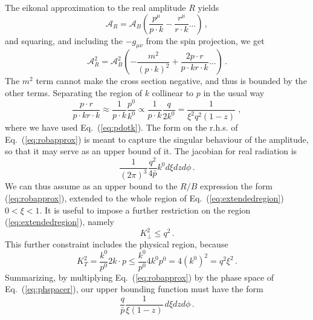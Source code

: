 \documentclass[11pt,a4paper]{article}
\begin{document}
The eikonal approximation to the real amplitude $R$ yields
\begin{equation}
  \mathcal{A}_R = \mathcal{A}_B \left( \frac{p^{\mu}}{p \cdot k} -
  \frac{r^{\mu}}{r \cdot k} \ldots \right) \, ,
\end{equation}
and squaring, and including the $- g_{\mu \nu}$ from the spin projection, we
get
\begin{equation}
  \mathcal{A}_R^2 = \mathcal{A}_B^2 \left( - \frac{m^2}{(p \cdot k)^2} +
  \frac{2 p \cdot r}{p \cdot kr \cdot k} \ldots \right) \, .
\end{equation}
The $m^2$ term cannot make the cross section negative, and thus is bounded
by the other terms. Separating the region of $k$ collinear to $p$ in the usual
way
\begin{equation}
  \frac{p \cdot r}{p \cdot kr \cdot k} \approx \frac{1}{p \cdot k} 
  \frac{p^0}{k^0} \propto \frac{1}{p \cdot k}  \frac{q}{2 k^0} =
  \frac{1}{\xi^2 q^2 \left( 1 - z \right)} \text{} \frac{}{} \text{} \, ,
  \label{eq:robapprox}
\end{equation}
where we have used Eq.~(\ref{eq:pdotk}). The form on the r.h.s. of
Eq.~(\ref{eq:robapprox}) is meant to capture the singular behaviour of the
amplitude, so that it may serve as an upper bound of it. The jacobian for real
radiation is
\begin{equation}
  \frac{1}{(2 \pi)^3} \frac{q^2}{4 \bar{p}} k^0 d \xi dzd \phi \, .
  \label{eq:phspacer}
\end{equation}
We can thus assume as an upper bound to the $R / B$ expression the form
(\ref{eq:robapprox}), extended to the whole region of Eq.~(\ref{eq:extendedregion}) 
$0 < \xi < 1$. It is useful to impose a further restriction on the region (\ref{eq:extendedregion}), 
namely
\begin{equation}
  K_{\perp}^2 \leqslant q^2 \, .
\end{equation}
This further constraint includes the physical region, because
\begin{equation}
  K_T^2 = \frac{k^0}{p^0} 2 k \cdot p \leqslant \frac{k^0}{p^0} 4 k^0 p^0 = 4
  (k^0)^2 = q^2 \xi^2 \, .
\end{equation}
Summarizing, by multiplying Eq.~(\ref{eq:robapprox}) by the phase space 
of Eq.~(\ref{eq:phspacer}), our upper bounding function must have the form
\begin{equation}
  \frac{q}{\bar{p}} \frac{1}{\xi \left( 1 - z \right)} \text{} \frac{}{}
  \text{} d \xi dzd \phi \, .
\end{equation}
\end{document}
